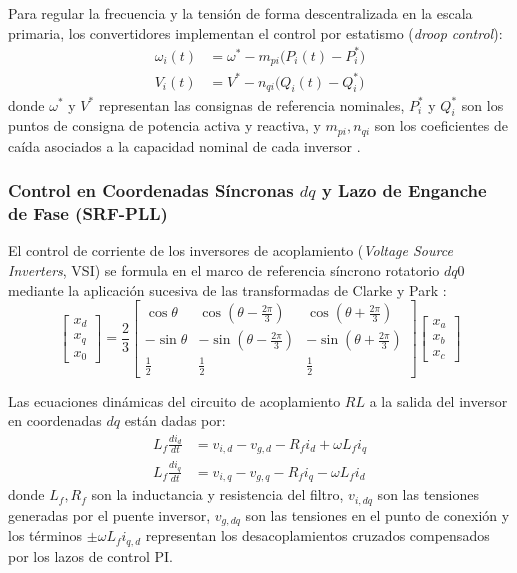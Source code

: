 Para regular la frecuencia y la tensión de forma descentralizada en la escala primaria, los convertidores implementan el control por estatismo (\textit{droop control}):
\begin{align}
\omega_i(t) &= \omega^* - m_{pi} \big(P_i(t) - P_i^* \big) \label{eq:droop_w} \\
V_i(t) &= V^* - n_{qi} \big(Q_i(t) - Q_i^* \big) \label{eq:droop_v}
\end{align}
donde $\omega^*$ y $V^*$ representan las consignas de referencia nominales, $P_i^*$ y $Q_i^*$ son los puntos de consigna de potencia activa y reactiva, y $m_{pi}, n_{qi}$ son los coeficientes de caída asociados a la capacidad nominal de cada inversor \citep{Jasim2023}.

\subsubsection{Control en Coordenadas Síncronas \texorpdfstring{$dq$}{dq} y Lazo de Enganche de Fase (SRF-PLL)}
El control de corriente de los inversores de acoplamiento (\textit{Voltage Source Inverters}, VSI) se formula en el marco de referencia síncrono rotatorio $dq0$ mediante la aplicación sucesiva de las transformadas de Clarke y Park \citep{Kundu2024ICCFPLL}:
\begin{equation}\label{eq:clarke_park}
\begin{bmatrix} x_d \\ x_q \\ x_0 \end{bmatrix} = \frac{2}{3} \begin{bmatrix} \cos\theta & \cos\left(\theta - \frac{2\pi}{3}\right) & \cos\left(\theta + \frac{2\pi}{3}\right) \\ -\sin\theta & -\sin\left(\theta - \frac{2\pi}{3}\right) & -\sin\left(\theta + \frac{2\pi}{3}\right) \\ \frac{1}{2} & \frac{1}{2} & \frac{1}{2} \end{bmatrix} \begin{bmatrix} x_a \\ x_b \\ x_c \end{bmatrix}
\end{equation}

Las ecuaciones dinámicas del circuito de acoplamiento $RL$ a la salida del inversor en coordenadas $dq$ están dadas por:
\begin{align}
L_f \frac{di_d}{dt} &= v_{i,d} - v_{g,d} - R_f i_d + \omega L_f i_q  \\
L_f \frac{di_q}{dt} &= v_{i,q} - v_{g,q} - R_f i_q - \omega L_f i_d 
\end{align}
donde $L_f, R_f$ son la inductancia y resistencia del filtro, $v_{i,dq}$ son las tensiones generadas por el puente inversor, $v_{g,dq}$ son las tensiones en el punto de conexión y los términos $\pm \omega L_f i_{q,d}$ representan los desacoplamientos cruzados compensados por los lazos de control PI.

